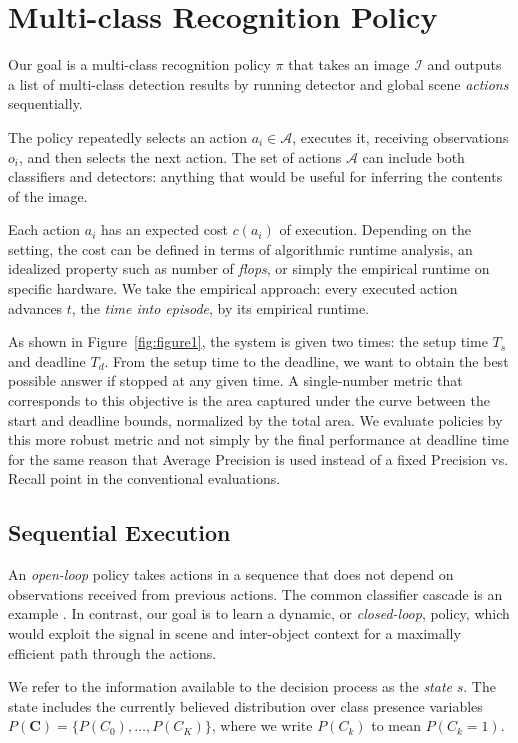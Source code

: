 
\section{Multi-class Recognition Policy} \label{sec:tech}

Our goal is a multi-class recognition policy $\pi$ that takes an image $\mathcal{I}$ and outputs a list of multi-class detection results by running detector and global scene \emph{actions} sequentially.

The policy repeatedly selects an action $a_i \in \mathcal{A}$, executes it, receiving observations $o_i$, and then selects the next action.
The set of actions $\mathcal{A}$ can include both classifiers and detectors: anything that would be useful for inferring the contents of the image.

Each action $a_i$ has an expected cost $c(a_i)$ of execution.
Depending on the setting, the cost can be defined in terms of algorithmic runtime analysis, an idealized property such as number of \emph{flops}, or simply the empirical runtime on specific hardware.
We take the empirical approach: every executed action advances $t$, the \emph{time into episode}, by its empirical runtime.

As shown in Figure~\ref{fig:figure1}, the system is given two times: the setup time $T_s$ and deadline $T_d$.
From the setup time to the deadline, we want to obtain the best possible answer if stopped at any given time.
A single-number metric that corresponds to this objective is the area captured under the curve between the start and deadline bounds, normalized by the total area.
We evaluate policies by this more robust metric and not simply by the final performance at deadline time for the same reason that Average Precision is used instead of a fixed Precision vs. Recall point in the conventional evaluations.

\subsection{Sequential Execution}
An \emph{open-loop} policy takes actions in a sequence that does not depend on observations received from previous actions.
The common classifier cascade is an example \cite{Viola2001}.
In contrast, our goal is to learn a dynamic, or \emph{closed-loop}, policy, which would exploit the signal in scene and inter-object context for a maximally efficient path through the actions.

We refer to the information available to the decision process as the \emph{state} $s$.
The state includes the currently believed distribution over class presence variables $P(\mathbf{C}) = \{P(C_0), \ldots, P(C_K)\}$, where we write $P(C_k)$ to mean $P(C_k=1)$.

